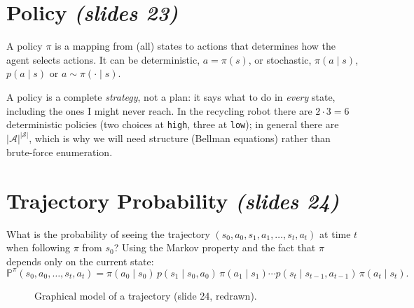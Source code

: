 \documentclass[11pt,a4paper]{article}
\newcommand{\PP}{\mathbb{P}}
\newcommand{\slr}[1]{\texorpdfstring{\emph{(slides #1)}}{(slides #1)}}
\newcommand{\cS}{\mathcal{S}}
\newcommand{\cA}{\mathcal{A}}
\theoremstyle{plain}
\theoremstyle{definition}
\theoremstyle{remark}
\begin{document}
\section{Policy \slr{23}}
A policy $\pi$ is a mapping from (all) states to actions that determines how the agent selects actions. It can be deterministic, $a=\pi(s)$, or stochastic, $\pi(a\mid s)$, $p(a\mid s)$ or $a\sim\pi(\cdot\mid s)$.

\begin{intuition}
A policy is a complete \emph{strategy}, not a plan: it says what to do in \emph{every} state, including the ones I might never reach. In the recycling robot there are $2\cdot3=6$ deterministic policies (two choices at \texttt{high}, three at \texttt{low}); in general there are $|\cA|^{|\cS|}$, which is why we will need structure (Bellman equations) rather than brute-force enumeration.
\end{intuition}

\section{Trajectory Probability \slr{24}}
What is the probability of seeing the trajectory $(s_0,a_0,s_1,a_1,\dots,s_t,a_t)$ at time $t$ when following $\pi$ from $s_0$? Using the Markov property and the fact that $\pi$ depends only on the current state:
\[
  \PP^\pi(s_0,a_0,\dots,s_t,a_t)=\pi(a_0\mid s_0)\,p(s_1\mid s_0,a_0)\,\pi(a_1\mid s_1)\cdots p(s_t\mid s_{t-1},a_{t-1})\,\pi(a_t\mid s_t).
\]

\begin{figure}[htbp]
\centering
{}
\caption{Graphical model of a trajectory (slide 24, redrawn).}
\end{figure}
\end{document}
